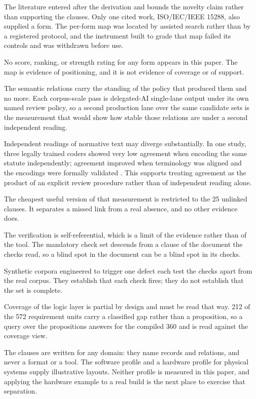 The literature entered after the derivation and bounds the novelty claim rather than supporting the clauses. Only one cited work, ISO/IEC/IEEE 15288, also supplied a form. The per-form map was located by assisted search rather than by a registered protocol, and the instrument built to grade that map failed its controls and was withdrawn before use.

No score, ranking, or strength rating for any form appears in this paper. The map is evidence of positioning, and it is not evidence of coverage or of support.

The semantic relations carry the standing of the policy that produced them and no more. Each corpus-scale pass is delegated-AI single-lane output under its own named review policy, so a second production lane over the same candidate sets is the measurement that would show how stable those relations are under a second independent reading.

Independent readings of normative text may diverge substantially. In one study, three legally trained coders showed very low agreement when encoding the same statute independently; agreement improved when terminology was aligned and the encodings were formally validated \citep[Section~3]{witt2024}. This supports treating agreement as the product of an explicit review procedure rather than of independent reading alone.

The cheapest useful version of that measurement is restricted to the 25 unlinked clauses. It separates a missed link from a real absence, and no other evidence does.

The verification is self-referential, which is a limit of the evidence rather than of the tool. The mandatory check set descends from a clause of the document the checks read, so a blind spot in the document can be a blind spot in its checks.

Synthetic corpora engineered to trigger one defect each test the checks apart from the real corpus. They establish that each check fires; they do not establish that the set is complete.

Coverage of the logic layer is partial by design and must be read that way. 212 of the 572 requirement units carry a classified gap rather than a proposition, so a query over the propositions answers for the compiled 360 and is read against the coverage view.

The clauses are written for any domain: they name records and relations, and never a format or a tool. The software profile and a hardware profile for physical systems supply illustrative layouts. Neither profile is measured in this paper, and applying the hardware example to a real build is the next place to exercise that separation.

